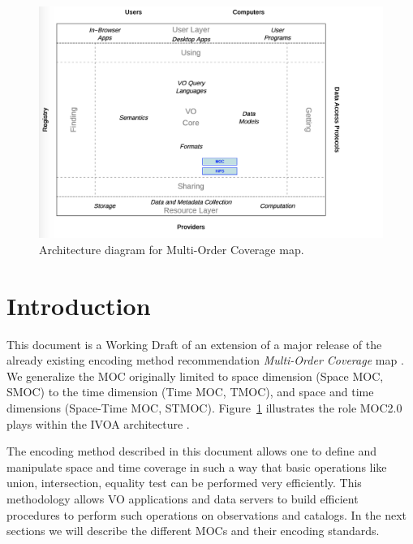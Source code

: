 \documentclass[11pt,a4paper]{ivoa}
\begin{document}
\begin{figure}[!htbp]
\begin{center}
\includegraphics[scale=.5]{architecture.png}
\end{center}
\caption[IVOA architecture diagram]{Architecture diagram for Multi-Order Coverage map.}
\label{fig:ivoadiagram}
\end{figure}

\section{Introduction}
This document is a Working Draft of an extension of a major release of
the already existing encoding method recommendation \emph{Multi-Order
  Coverage} map \citep[MOC~1.1,][]{2019ivoa.spec.1007F}. We generalize the MOC
originally limited to space dimension (Space MOC, SMOC) to the time
dimension (Time MOC, TMOC), and space and time dimensions (Space-Time
MOC, STMOC). Figure~\ref{fig:ivoadiagram} illustrates the role MOC2.0
plays within the IVOA architecture \citep{note:VOARCH}.

The encoding method described in this document allows one to define
and manipulate space and time coverage in such a way that basic
operations like union, intersection, equality test can be performed
very efficiently. This methodology allows VO applications and
data servers to build efficient
procedures to perform such operations on observations and catalogs. 
In the next sections we will describe the different MOCs and their
encoding standards.
\end{document}
